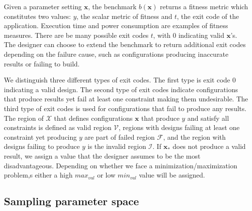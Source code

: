 \documentclass[10pt,conference,a4paper]{IEEEtran}
\begin{document}
Given a parameter setting $\mathbf{x}$, the benchmark $b(\mathbf{x})$ returns a fitness metric which constitutes two values: $y$, the scalar metric of fitness and $t$, the exit code of the application. Execution time and power consumption are examples of fitness measures. There are be many possible exit codes $t$, with 0 indicating valid $\mathbf{x}$'s. The designer can choose to extend the benchmark to return additional exit codes depending on the failure cause, such as configurations producing inaccurate results or failing to build. 

We distinguish three different types of exit codes. The first type is exit code 0 indicating a valid design. The second type of exit codes indicate configurations that produce results yet fail at least one constraint making them undesirable. The third type of exit codes is used for configurations that fail to produce any results. The region of $\mathcal{X}$ that defines configurations $\mathbf{x}$ that produce $y$ and satisfy all constraints is defined as valid region $\mathcal{V}$, regions with designs failing at least one constraint yet producing $y$ are part of failed region $\mathcal{F}$, and the region with designs failing to produce $y$ is the invalid region $\mathcal{I}$. If $\mathbf{x_*}$ does not produce a valid result, we assign a value that the designer assumes to be the most disadvantageous. Depending on whether we face a minimization/maximization problem,s either a high $max_{val}$ or low $min_{val}$ value will be assigned.




\subsection{Sampling parameter space} 
\label{designspace}
\end{document}
